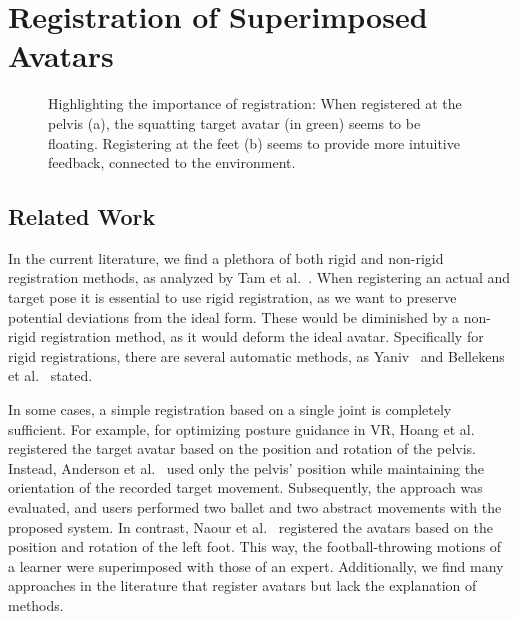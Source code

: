 
\chapter{Registration of Superimposed Avatars \label{chap:registration}}
\begin{figure}[ht]
	\centering
	\caption{Highlighting the importance of registration: When registered at the pelvis (a), the squatting target avatar (in green) seems to be floating. Registering at the feet (b) seems to provide more intuitive feedback, connected to the environment.}
	\label{fig:registrationComparison}
\end{figure}

\section{Related Work \label{sec:relReg}}
In the current literature, we find a plethora of both rigid and non-rigid registration methods, as analyzed by Tam et al.~\cite{tam2012registration}. When registering an actual and target pose it is essential to use rigid registration, as we want to preserve potential deviations from the ideal form. These would be diminished by a non-rigid registration method, as it would deform the ideal avatar. Specifically for rigid registrations, there are several automatic methods, as Yaniv~\cite{yaniv2008rigid} and Bellekens et al.~\cite{bellekens2014survey} stated.

In some cases, a simple registration based on a single joint is completely sufficient. For example, for optimizing posture guidance in VR, Hoang et al.~\cite{hoang2016onebody} registered the target avatar based on the position and rotation of the pelvis. Instead, Anderson et al.~\cite{anderson2013youmove} used only the pelvis' position while maintaining the orientation of the recorded target movement. Subsequently, the approach was evaluated, and users performed two ballet and two abstract movements with the proposed system. In contrast, Naour et al.~\cite{naour2019superimpose} registered the avatars based on the position and rotation of the left foot. This way, the football-throwing motions of a learner were superimposed with those of an expert. Additionally, we find many approaches in the literature that register avatars but lack the explanation of methods.

